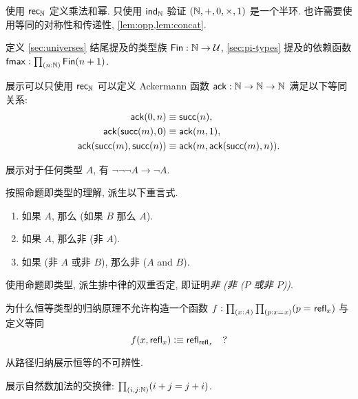 \begin{ex}
    \label{ex:nat-semiring}
    使用 $\mathsf{rec}_{\mathbb{N}}$ 定义乘法和幂.
    只使用 $\mathsf{ind}_{\mathbb{N}}$ 验证 $(\mathbb{N},+,0,\times,1)$ 是一个半环.
    也许需要使用等同的对称性和传递性, \cref{lem:opp,lem:concat}.
\end{ex}

\begin{ex}
    \label{ex:fin}
    定义 \cref{sec:universes} 结尾提及的类型族 $\mathsf{Fin} : \mathbb{N} \to \mathcal{U}$, \cref{sec:pi-types} 提及的依赖函数 $\fmax : \prd{n:\nat} \Fin(n+1)$.
\end{ex}

\begin{ex}
    \label{ex:ackermann}
    展示可以只使用 $\mathsf{rec}_{\mathbb{N}}$ 可以定义 Ackermann 函数 $\mathsf{ack} : \mathbb{N} \to \mathbb{N} \to \mathbb{N}$ 满足以下等同关系:
    \begin{align*}
        \mathsf{ack}(0,n) &\equiv \mathsf{succ}(n), \\
        \mathsf{ack}(\mathsf{succ}(m),0) &\equiv \mathsf{ack}(m,1), \\
        \mathsf{ack}(\mathsf{succ}(m),\mathsf{succ}(n)) &\equiv \mathsf{ack}(m,\mathsf{ack}(\mathsf{succ}(m),n)).
    \end{align*}
\end{ex}

\begin{ex}
    \label{ex:neg-ldn}
    展示对于任何类型 $A$, 有 $\neg\neg\neg A \to \neg A$.
\end{ex}

\begin{ex}
    \label{ex:tautologies}
    按照命题即类型的理解, 派生以下重言式.
    \begin{enumerate}
        \item 如果 $A$, 那么 (如果 $B$ 那么 $A$).
        \item 如果 $A$, 那么非 (非 $A$).
        \item 如果 (非 $A$ 或非 $B$), 那么非 ($A$ and $B$).
    \end{enumerate}
\end{ex}

\begin{ex}
    \label{ex:not-not-lem}
    使用命题即类型, 派生排中律的双重否定, 即证明\emph{非 (非 ($P$ 或非 $P$))}.
\end{ex}

\begin{ex}
    \label{ex:without-K}
    为什么恒等类型的归纳原理不允许构造一个函数 $f: \prd{x:A}{p:\id{x}{x}} (\id{p}{\refl{x}})$ 与定义等同
    \[ f(x,\mathsf{refl}_{x}) \vcentcolon\equiv \mathsf{refl}_{\mathsf{refl}_{x}} \quad ?\]
\end{ex}

\begin{ex}
    \label{ex:subtFromPathInd}
    从路径归纳展示恒等的不可辨性.
\end{ex}

\begin{ex}
    \label{ex:add-nat-commutative}
    展示自然数加法的交换律: $\prd{i,j:\nat} (i+j=j+i)$.
\end{ex}